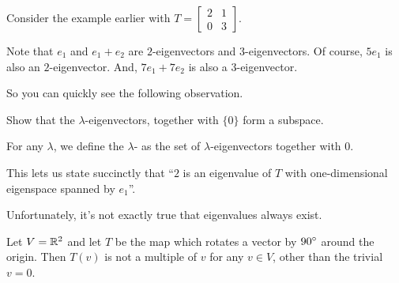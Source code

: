 \begin{example}
	Consider the example earlier with
	$T = \begin{bmatrix} 2 & 1 \\ 0 & 3 \end{bmatrix}$.
	\begin{enumerate}[(a)]
		\ii Note that $e_1$ and $e_1 + e_2$ are
		$2$-eigenvectors and $3$-eigenvectors.
		\ii Of course, $5e_1$ is also an $2$-eigenvector.
		\ii And, $7e_1 + 7e_2$ is also a $3$-eigenvector.
	\end{enumerate}
\end{example}
So you can quickly see the following observation.
\begin{ques}
	Show that the $\lambda$-eigenvectors, together with $\{0\}$
	form a subspace.
\end{ques}
\begin{definition}
	For any $\lambda$, we define the $\lambda$-
	as the set of $\lambda$-eigenvectors together with $0$.
\end{definition}
This lets us state succinctly that
``$2$ is an eigenvalue of $T$
with one-dimensional eigenspace spanned by $e_1$''.

Unfortunately, it's not exactly true that eigenvalues always exist.
\begin{example}
	Let $V = \mathbb R^2$ and let $T$ be the map
	which rotates a vector by $90^\circ$
	around the origin.
	Then $T(v)$ is not a multiple of $v$ for any $v \in V$,
	other than the trivial $v=0$.
\end{example}

